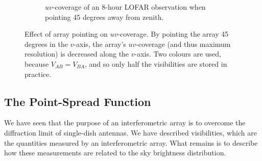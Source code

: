 \begin{figure}[ht]
\begin{subfigure}{.40\textwidth}
\caption{\label{fig.lofar.uvcoverage.elsewhere} $uv$-coverage of an 8-hour LOFAR observation when pointing 45 degrees away from zenith.}
\end{subfigure}
\caption{\label{fig.uvcoverage.lofar} Effect of array pointing on $uv$-coverage. By pointing the array 45 degrees in the $v$-axis, the array's $uv$-coverage (and thus maximum resolution) is decreased along the $v$-axis. Two colours are used, because $V_{AB}=V_{BA}$, and so only half the visibilities are stored in practice.}
\end{figure}


\subsection{The Point-Spread Function}\label{sec.imag.psf}

\pg
We have seen that the purpose of an interferometric array is to overcome the diffraction limit of single-dish antennas. We have described visibilities, which are the quantities measured by an interferometric array. What remains is to describe how these measurements are related to the sky brightness distribution.

